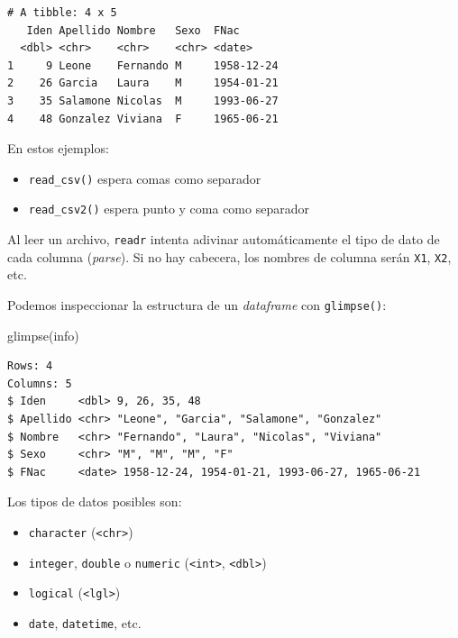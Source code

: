 \documentclass[
  spanish,
  a4paper,
]{scrbook}
\newenvironment{Shaded}{\begin{snugshade}}{\end{snugshade}}
\newcommand{\FunctionTok}[1]{\textcolor[rgb]{0.28,0.35,0.67}{#1}}
\newcommand{\NormalTok}[1]{\textcolor[rgb]{0.00,0.23,0.31}{#1}}
\begin{document}
\begin{verbatim}
# A tibble: 4 x 5
   Iden Apellido Nombre   Sexo  FNac      
  <dbl> <chr>    <chr>    <chr> <date>    
1     9 Leone    Fernando M     1958-12-24
2    26 Garcia   Laura    M     1954-01-21
3    35 Salamone Nicolas  M     1993-06-27
4    48 Gonzalez Viviana  F     1965-06-21
\end{verbatim}

En estos ejemplos:

\begin{itemize}
\item
  \texttt{read\_csv()} espera comas como separador
\item
  \texttt{read\_csv2()} espera punto y coma como separador
\end{itemize}

Al leer un archivo, \texttt{readr} intenta adivinar automáticamente el
tipo de dato de cada columna (\emph{parse}). Si no hay cabecera, los
nombres de columna serán \texttt{X1}, \texttt{X2}, etc.

Podemos inspeccionar la estructura de un \emph{dataframe} con
\texttt{glimpse()}:

\begin{Shaded}
\begin{Highlighting}[]
\FunctionTok{glimpse}\NormalTok{(info)}
\end{Highlighting}
\end{Shaded}

\begin{verbatim}
Rows: 4
Columns: 5
$ Iden     <dbl> 9, 26, 35, 48
$ Apellido <chr> "Leone", "Garcia", "Salamone", "Gonzalez"
$ Nombre   <chr> "Fernando", "Laura", "Nicolas", "Viviana"
$ Sexo     <chr> "M", "M", "M", "F"
$ FNac     <date> 1958-12-24, 1954-01-21, 1993-06-27, 1965-06-21
\end{verbatim}

Los tipos de datos posibles son:

\begin{itemize}
\item
  \texttt{character} (\texttt{\textless{}chr\textgreater{}})
\item
  \texttt{integer}, \texttt{double} o \texttt{numeric}
  (\texttt{\textless{}int\textgreater{}},
  \texttt{\textless{}dbl\textgreater{}})
\item
  \texttt{logical} (\texttt{\textless{}lgl\textgreater{}})
\item
  \texttt{date}, \texttt{datetime}, etc.
\end{itemize}
\end{document}
